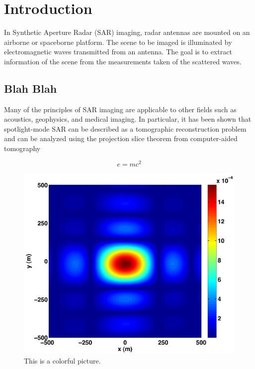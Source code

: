 \chapter{Introduction}

In Synthetic Aperture Radar (SAR) imaging, radar antennas are mounted on an airborne or spaceborne platform. The scene to be imaged is illuminated by electromagnetic waves transmitted from an antenna. The goal is to extract information of the scene from the measurements taken of the scattered waves.

\section{Blah Blah}


Many of the principles of SAR imaging are applicable to other fields such as
acoustics, geophysics, and medical imaging. In particular, it has been shown
that spotlight-mode SAR can be described as a tomographic reconstruction problem
and can be analyzed using the projection slice theorem from computer-aided
tomography\cite{Garza:2011fk}

\begin{equation}\label{eq:einstein}
	e = mc^{2}
\end{equation}



\begin{figure}
  \centering
  \includegraphics[scale=0.5]{figures/beamfootprint}
  \caption[Colorful Picture]{This is a colorful picture.}
  \label{fig:flyover}
\end{figure}

